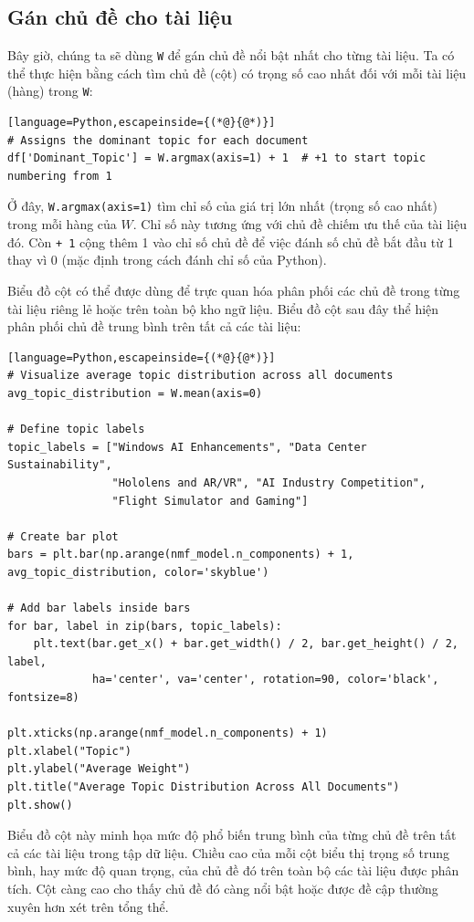 \subsection{Gán chủ đề cho tài liệu}

Bây giờ, chúng ta sẽ dùng \texttt{W} để gán chủ đề nổi bật nhất cho từng tài liệu. Ta có thể thực hiện bằng cách tìm chủ đề (cột) có trọng số cao nhất đối với mỗi tài liệu (hàng) trong \texttt{W}:

\begin{lstlisting}[language=Python,escapeinside={(*@}{@*)}]
# Assigns the dominant topic for each document
df['Dominant_Topic'] = W.argmax(axis=1) + 1  # +1 to start topic numbering from 1
\end{lstlisting}

Ở đây, \texttt{W.argmax(axis=1)} tìm chỉ số của giá trị lớn nhất (trọng số cao nhất) trong mỗi hàng của \(W\). Chỉ số này tương ứng với chủ đề chiếm ưu thế của tài liệu đó. Còn \texttt{+\ 1} cộng thêm 1 vào chỉ số chủ đề để việc đánh số chủ đề bắt đầu từ 1 thay vì 0 (mặc định trong cách đánh chỉ số của Python).

Biểu đồ cột có thể được dùng để trực quan hóa phân phối các chủ đề trong từng tài liệu riêng lẻ hoặc trên toàn bộ kho ngữ liệu. Biểu đồ cột sau đây thể hiện phân phối chủ đề trung bình trên tất cả các tài liệu:

\begin{lstlisting}[language=Python,escapeinside={(*@}{@*)}]
# Visualize average topic distribution across all documents
avg_topic_distribution = W.mean(axis=0)

# Define topic labels
topic_labels = ["Windows AI Enhancements", "Data Center Sustainability",
                "Hololens and AR/VR", "AI Industry Competition",
                "Flight Simulator and Gaming"]

# Create bar plot
bars = plt.bar(np.arange(nmf_model.n_components) + 1, avg_topic_distribution, color='skyblue')

# Add bar labels inside bars
for bar, label in zip(bars, topic_labels):
    plt.text(bar.get_x() + bar.get_width() / 2, bar.get_height() / 2, label,
             ha='center', va='center', rotation=90, color='black', fontsize=8)

plt.xticks(np.arange(nmf_model.n_components) + 1)
plt.xlabel("Topic")
plt.ylabel("Average Weight")
plt.title("Average Topic Distribution Across All Documents")
plt.show()
\end{lstlisting}

Biểu đồ cột này minh họa mức độ phổ biến trung bình của từng chủ đề trên tất cả các tài liệu trong tập dữ liệu. Chiều cao của mỗi cột biểu thị trọng số trung bình, hay mức độ quan trọng, của chủ đề đó trên toàn bộ các tài liệu được phân tích. Cột càng cao cho thấy chủ đề đó càng nổi bật hoặc được đề cập thường xuyên hơn xét trên tổng thể.


